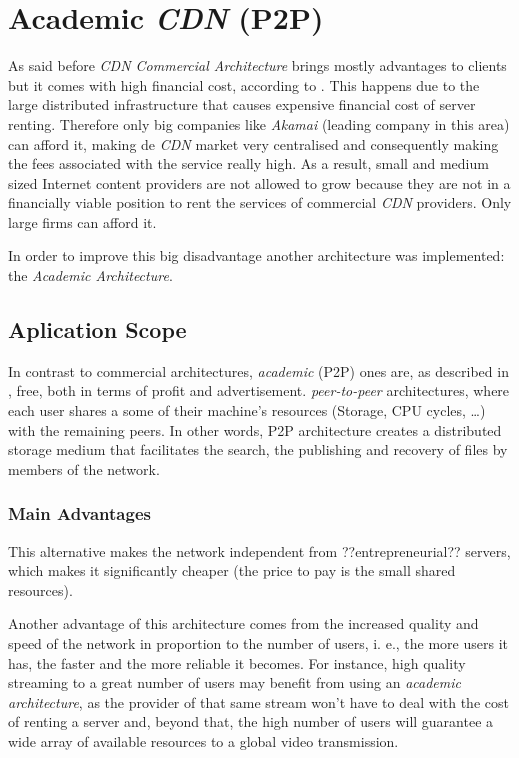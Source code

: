 \documentclass{llncs}
\begin{document}
\section{Academic \textit{CDN} (P2P)}						%

As said before \emph{CDN Commercial Architecture} brings mostly advantages to clients but it comes with high financial cost, according to \cite{DCDN}. This
happens due to the large distributed infrastructure that causes expensive
financial cost of server renting. Therefore only big companies like \emph{Akamai}
(leading company in this area) can afford it, making de \textit{CDN} market very
centralised and consequently making the fees associated with the service
really high. As a result, small and medium sized Internet content providers
are not allowed to grow because they are not in a financially viable position
to rent the services of commercial \textit{CDN} providers. Only large firms can
afford it.


In order to improve this big disadvantage another architecture was implemented:
the \emph{Academic Architecture}.

\subsection{Aplication Scope}

In contrast to commercial architectures, \emph{academic} (P2P) ones are, as described in 
\cite{DCDN}, free, both in terms of profit and advertisement. \emph{peer-to-peer} architectures, where each user shares a some of their machine's resources (Storage, CPU cycles, \dots) with the remaining
peers. 
In other words, P2P architecture creates a distributed storage medium that facilitates the search, the publishing and recovery of files by members of the network.

\subsubsection{Main Advantages}

This alternative makes the network independent from ??entrepreneurial?? servers,
which makes it significantly cheaper (the price to pay is the small shared resources).

Another advantage of this architecture comes from the increased quality and speed
of the network in proportion to the number of users, i. e., the more users it has,
the faster and the more reliable it becomes. 
For instance, high quality streaming to a great number of users may benefit from
using an \emph{academic architecture}, as the provider of that same stream won't
have to deal with the cost of renting a server and, beyond that, the high number
of users will guarantee a wide array of available resources to a global video
transmission.
\end{document}
